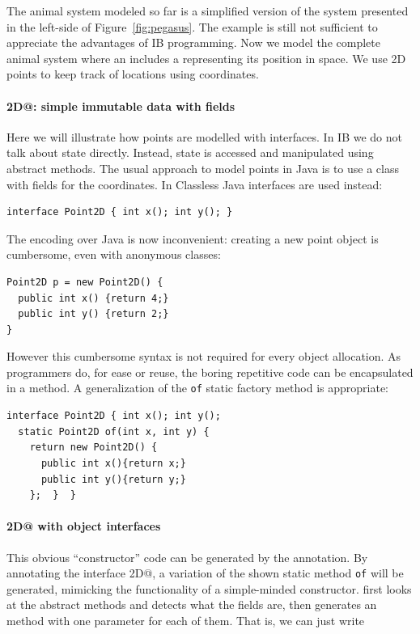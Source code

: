 The animal system modeled so far is a simplified version of the
system presented in the left-side of Figure~\ref{fig:pegasus}.
The example is still not sufficient to appreciate the advantages of IB
programming.
Now we model the complete animal system where an \Q@Animal@ includes a \Q@location@
representing its position in space. We use 2D points to keep track of locations using coordinates.

\paragraph{\Q@Point2D@: simple immutable data with fields}
Here we will illustrate how points are modelled with interfaces. In IB
we do not talk about state directly. Instead, state is accessed and
manipulated using abstract methods.  The usual approach to model
points in Java is to use a class with fields for the coordinates.
In Classless Java interfaces are used instead:

\begin{lstlisting}
interface Point2D { int x(); int y(); }
\end{lstlisting}

\noindent The encoding over Java is now inconvenient: creating a new point object is cumbersome, even
with anonymous classes:

\begin{lstlisting}
Point2D p = new Point2D() {
  public int x() {return 4;}
  public int y() {return 2;}
}
\end{lstlisting}

\noindent However this cumbersome syntax is not required for every
object allocation. As programmers do, for ease or reuse, the boring
repetitive code can be encapsulated in a method. A generalization of the
\texttt{of} static factory method is appropriate:%
\begin{lstlisting}
interface Point2D { int x(); int y();
  static Point2D of(int x, int y) {
    return new Point2D() {
      public int x(){return x;}
      public int y(){return y;}
    };  }  }
\end{lstlisting}

\vspace{-5pt}
\paragraph{\Q@Point2D@ with object interfaces}
This obvious ``constructor'' code can be generated by the \mixin
annotation.  By annotating the interface \Q@Point2D@, a variation of the shown
static method \texttt{of} will be generated, mimicking the functionality of a
simple-minded constructor. \mixin first looks at the abstract methods and detects
what the fields are, then generates an \Q@of@ method with one parameter for each
of them. That is, we can just write

